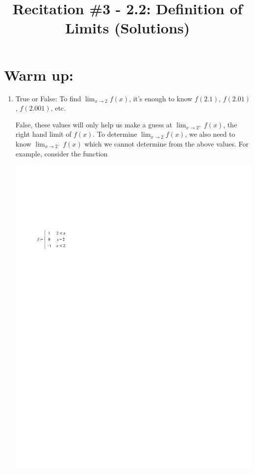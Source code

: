 \documentclass[nooutcomes]{ximera}
\title{Recitation \#3 - 2.2:  Definition of Limits (Solutions)}
\begin{document}
\begin{abstract}		\end{abstract}
\maketitle

\section*{Warm up:} 

	\begin{enumerate}[label=(\alph*)]
	
	\item  True or False: To find $\lim_{x \to 2} f(x)$, it's enough to know $f(2.1)$, $f(2.01)$, $f(2.001)$, etc.
	\begin{freeResponse}
	 False, these values will only help us make a guess at $\lim_{x \to 2^+} f(x)$, the right hand limit of $f(x)$.  To determine $\lim_{x \to 2} f(x)$, we also need to know $\lim_{x \to 2^-} f(x)$ which we cannot determine from the above values.  For example, consider the function
	 	\begin{image}
	 	\includegraphics[trim= 70 570 300 165]{Figure2.pdf}
	 	\end{image}
	 	

\end{freeResponse}
\end{enumerate}
\end{document}
